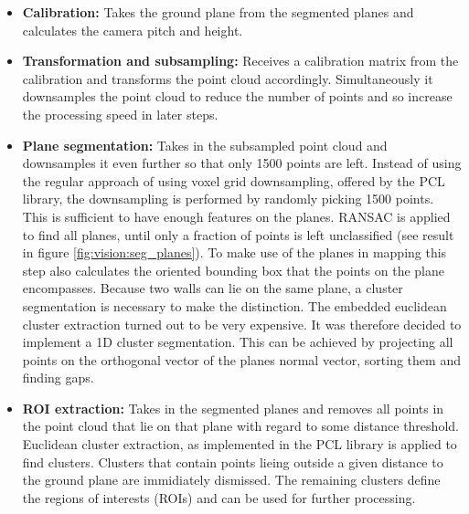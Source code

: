 \begin{itemize}
\item \textbf{Calibration:}
Takes the ground plane from the segmented planes and calculates the camera pitch and height.
\item \textbf{Transformation and subsampling:}
Receives a calibration matrix from the calibration and transforms the point cloud accordingly.
Simultaneously it downsamples the point cloud to reduce the number of points and so increase the processing speed in later steps.
\item \textbf{Plane segmentation:}
Takes in the subsampled point cloud and downsamples it even further so that only 1500 points are left.
Instead of using the regular approach of using voxel grid downsampling, offered by the PCL library,
the downsampling is performed by randomly picking 1500 points.
This is sufficient to have enough features on the planes.
RANSAC is applied to find all planes, until only a fraction of points is left unclassified (see result in figure \ref{fig:vision:seg_planes}).
To make use of the planes in mapping this step also calculates the oriented bounding box that the points on the plane encompasses.
Because two walls can lie on the same plane, a cluster segmentation is necessary to make the distinction.
The embedded euclidean cluster extraction turned out to be very expensive.
It was therefore decided to implement a 1D cluster segmentation. 
This can be achieved by projecting all points on the orthogonal vector of the planes normal vector, sorting them and finding gaps.
\item \textbf{ROI extraction:}
Takes in the segmented planes and removes all points in the point cloud that lie on that plane with regard to some distance threshold.
Euclidean cluster extraction, as implemented in the PCL library is applied to find clusters. 
Clusters that contain points lieing outside a given distance to the ground plane are immidiately dismissed.
The remaining clusters define the regions of interests (ROIs) and can be used for further processing.
\end{itemize}

